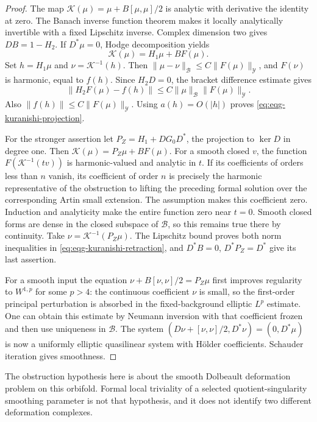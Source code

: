 \begin{proof}
The map $\mathcal K(\mu)=\mu+B[\mu,\mu]/2$ is analytic with
derivative the identity at zero.  The Banach inverse function theorem
makes it locally analytically invertible with a fixed Lipschitz inverse.
Complex dimension two gives $DB=1-H_2$.
If $D^*\mu=0$, Hodge decomposition yields
\[
 \mathcal K(\mu)=H_1\mu+BF(\mu).
\]
Set $h=H_1\mu$ and $\nu=\mathcal K^{-1}(h)$.
Then $\|\mu-\nu\|_{\mathcal B}\leq C\|F(\mu)\|_{\mathcal Y}$,
and $F(\nu)$ is harmonic, equal to $f(h)$.
Since $H_2D=0$, the bracket difference estimate gives
\[
 \|H_2F(\mu)-f(h)\|
 \leq C\|\mu\|_{\mathcal B}\|F(\mu)\|_{\mathcal Y}.
\]
Also $\|f(h)\|\leq C\|F(\mu)\|_{\mathcal Y}$.
Using $a(h)=O(|h|)$ proves
\eqref{eq:eqg-kuranishi-projection}.

For the stronger assertion let
$P_Z=H_1+DG_0D^*$, the projection to $\ker D$ in degree one.
Then $\mathcal K(\mu)=P_Z\mu+BF(\mu)$.
For a smooth closed $v$, the function
$F(\mathcal K^{-1}(tv))$ is harmonic-valued and analytic in $t$.
If its coefficients of orders less than $n$ vanish, its coefficient
of order $n$ is precisely the harmonic representative of the
obstruction to lifting the preceding formal solution over the
corresponding Artin small extension.  The assumption makes this
coefficient zero.  Induction and analyticity make the entire function
zero near $t=0$.  Smooth closed forms are dense in the closed
subspace of $\mathcal B$, so this remains true there by continuity.
Take $\nu=\mathcal K^{-1}(P_Z\mu)$.
The Lipschitz bound proves both norm inequalities in
\eqref{eq:eqg-kuranishi-retraction}, and
$D^*B=0$, $D^*P_Z=D^*$ give its last assertion.

For a smooth input the equation
$\nu+B[\nu,\nu]/2=P_Z\mu$ first improves regularity to
$W^{1,p}$ for some $p>4$: the continuous coefficient $\nu$ is
small, so the first-order principal perturbation is absorbed in
the fixed-background elliptic $L^p$ estimate.  One can obtain this
estimate by Neumann inversion with that coefficient frozen and
then use uniqueness in $\mathcal B$.  The system
$(D\nu+[\nu,\nu]/2,D^*\nu)=(0,D^*\mu)$ is now a uniformly
elliptic quasilinear system with Hölder coefficients.  Schauder
iteration gives smoothness.
\end{proof}

The obstruction hypothesis here is about the smooth Dolbeault
deformation problem on this orbifold.  Formal local triviality of a
selected quotient-singularity smoothing parameter is not that
hypothesis, and it does not identify two different deformation
complexes.

